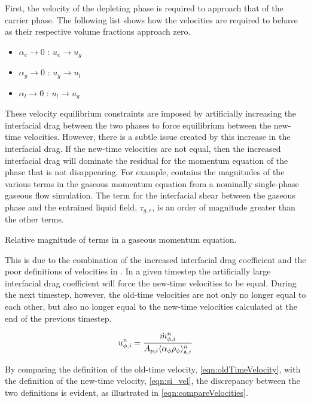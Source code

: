 First, the velocity of the depleting phase is required to approach that of the carrier phase.
The following list shows how the velocities are required to behave as their respective volume fractions approach zero.
\begin{itemize}
\item{ $\alpha_e \rightarrow 0$ : $u_e \rightarrow u_g$}
\item{ $\alpha_g \rightarrow 0$ : $u_g \rightarrow u_l$}
\item{ $\alpha_l \rightarrow 0$ : $u_l \rightarrow u_g$}
\end{itemize}
These velocity equilibrium constraints are imposed by artificially increasing the interfacial drag between the two phases to force equilibrium between the new-time velocities.
However, there is a subtle issue created by this increase in the interfacial drag.
If the new-time velocities are not equal, then the increased interfacial drag will dominate the residual for the momentum equation of the phase that is not disappearing.
For example,  contains the magnitudes of the various terms in the gaseous momentum equation from a nominally single-phase gaseous flow simulation.
The term for the interfacial shear between the gaseous phase and the entrained liquid field, $\tau_{g, e}$, is an order of magnitude greater than the other terms.

\begin{table}[ht]
\centering
\singlespace

\caption{Relative magnitude of terms in a gaseous momentum equation.}
\label{tab:gasMomentumResidual}
\end{table}

This is due to the combination of the increased interfacial drag coefficient and the poor definitions of velocities in \cobra{}.
In a given timestep the artificially large interfacial drag coefficient will force the new-time velocities to be equal.
During the next timestep, however, the old-time velocities are not only no longer equal to each other, but also no longer equal to the new-time velocities calculated at the end of the previous timestep.

\begin{equation}
\label{eqn:oldTimeVelocity}
u^{n}_{\phi, i} = \frac{\dot{m}^{n}_{\phi, i}}{A_{p, i} \ave{\alpha_{\phi} \rho_{\phi}}^{n}_{\text{a}, i}} 
\end{equation}

By comparing the definition of the old-time velocity, \eqref{eqn:oldTimeVelocity}, with the definition of the new-time velocity, \eqref{eqn:si_vel}, the discrepancy between the two definitions is evident, as illustrated in \eqref{eqn:compareVelocities}.


